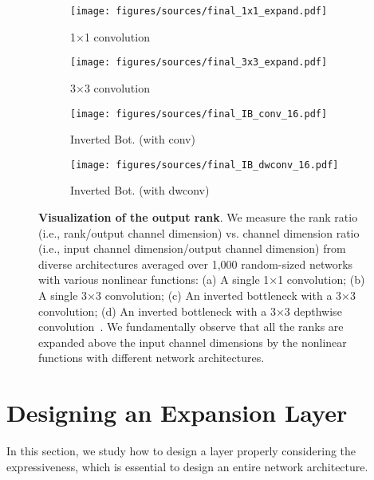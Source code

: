 \begin{figure*}[t]
\small
\centering
\hspace{-4mm}
\begin{subfigure}[ht!]{0.24\linewidth}
\texttt{[image: figures/sources/final\_1x1\_expand.pdf]}
\vspace{-6mm}
\caption{\small 1×1 convolution}
\label{subfig:layer1x1}
\end{subfigure}
\begin{subfigure}[ht!]{0.24\linewidth}
\texttt{[image: figures/sources/final\_3x3\_expand.pdf]}
\vspace{-6mm}
\caption{\small 3×3 convolution}
\label{subfig:layer3x3}
\end{subfigure}
\begin{subfigure}[ht!]{0.24\linewidth}
\texttt{[image: figures/sources/final\_IB\_conv\_16.pdf]}
\vspace{-6mm}
\caption{\small Inverted Bot. (with conv)}
\label{subfig:IB_conv}
\end{subfigure}
\begin{subfigure}[ht!]{0.24\linewidth}
\texttt{[image: figures/sources/final\_IB\_dwconv\_16.pdf]}
\vspace{-6mm}
\caption{\small Inverted Bot. (with dwconv)}
\label{subfig:IB_dwconv}
\end{subfigure}
\vspace{-3mm}
\caption{\small {\bf Visualization of the output rank}. We measure the rank ratio (i.e., rank/output channel dimension) vs. channel dimension ratio (i.e., input channel dimension/output channel dimension) from diverse architectures averaged over 1,000 random-sized networks with various nonlinear functions: (a) A single 1×1 convolution; (b) A single 3×3 convolution; (c) An inverted bottleneck with a 3×3 convolution; (d) An inverted bottleneck with a 3×3 depthwise convolution~\cite{mobilenetv2}. We fundamentally observe that all the ranks are expanded above the input channel dimensions by the nonlinear functions with different network architectures.}
\label{fig:rank_test}
\vspace{-5mm}
\end{figure*}

 
\section{Designing an Expansion Layer}
\label{section:sec3}
In this section, we study how to design a layer properly considering the expressiveness, which is essential to design an entire network architecture.

